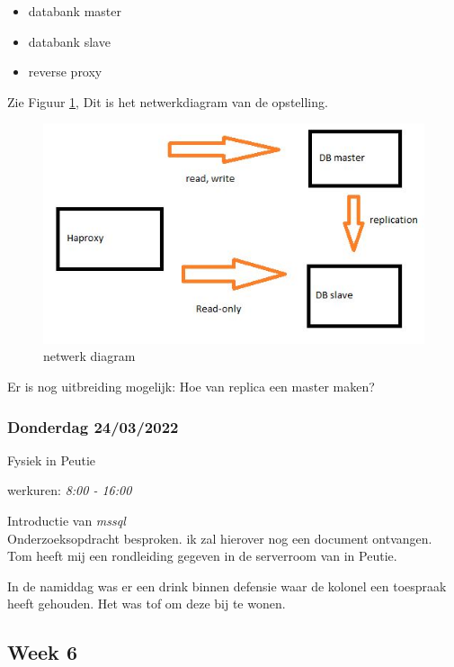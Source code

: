 \begin{itemize}
    \item
    databank master
    \item
    databank slave
    \item
    reverse proxy
\end{itemize}

Zie Figuur \ref{fig:netwerkdiagram-db-replicatie}, Dit is het netwerkdiagram van de opstelling.

\begin{figure}
    \centering
    \includegraphics{img/networkdiagram_db_replication.JPG}
    \caption{\label{fig:netwerkdiagram-db-replicatie}netwerk diagram}
\end{figure}

Er is nog uitbreiding mogelijk: Hoe van replica een master maken?

\subsubsection{Donderdag 24/03/2022}

Fysiek in Peutie

werkuren: \emph{8:00 - 16:00}

Introductie van \emph{\gls{mssql}}\\
Onderzoeksopdracht besproken. ik zal hierover nog een document
ontvangen.\\
Tom heeft mij een rondleiding gegeven in de serverroom van in Peutie.

In de namiddag was er een drink binnen defensie waar de kolonel een
toespraak heeft gehouden. Het was tof om deze bij te wonen.

\subsection{Week 6}


